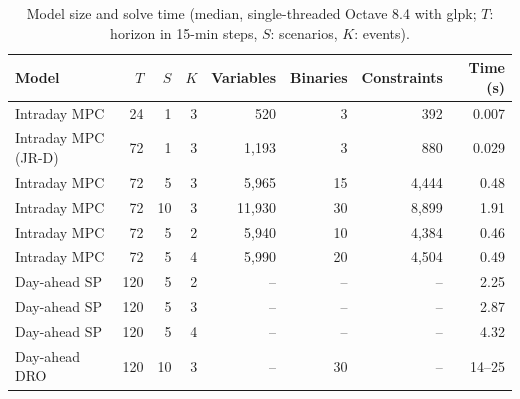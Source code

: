 \begin{table}[!t]
\caption{Model size and solve time (median, single-threaded Octave 8.4 with glpk; $T$: horizon in 15-min steps,
$S$: scenarios, $K$: events).}
\label{tab:timing}
\centering\footnotesize
\setlength{\tabcolsep}{3.2pt}
\begin{tabular}{@{}lrrrrrrr@{}}
\toprule
Model & $T$ & $S$ & $K$ & Variables & Binaries & Constraints & Time (s)\\
\midrule
Intraday MPC & 24 & 1 & 3 & 520 & 3 & 392 & 0.007\\
Intraday MPC (JR-D) & 72 & 1 & 3 & 1,193 & 3 & 880 & 0.029\\
Intraday MPC & 72 & 5 & 3 & 5,965 & 15 & 4,444 & 0.48\\
Intraday MPC & 72 & 10 & 3 & 11,930 & 30 & 8,899 & 1.91\\
Intraday MPC & 72 & 5 & 2 & 5,940 & 10 & 4,384 & 0.46\\
Intraday MPC & 72 & 5 & 4 & 5,990 & 20 & 4,504 & 0.49\\
Day-ahead SP & 120 & 5 & 2 & -- & -- & -- & 2.25\\
Day-ahead SP & 120 & 5 & 3 & -- & -- & -- & 2.87\\
Day-ahead SP & 120 & 5 & 4 & -- & -- & -- & 4.32\\
Day-ahead DRO & 120 & 10 & 3 & -- & 30 & -- & 14--25\\
\bottomrule
\end{tabular}
\end{table}
